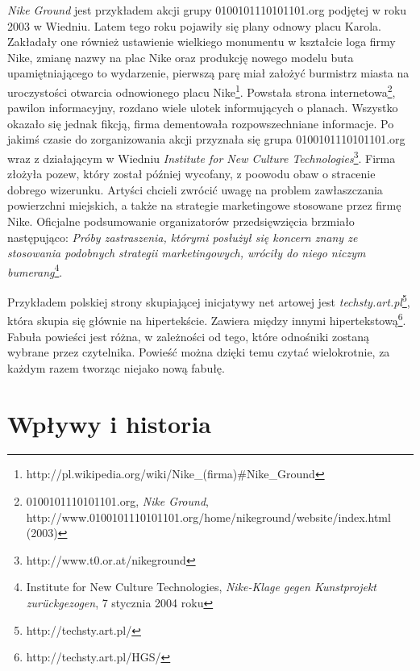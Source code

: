 \documentclass[a4paper,12pt,twoside]{article}
\begin{document}
\textit{Nike Ground} jest przykładem akcji grupy 
0100101110101101.org podjętej w roku 2003 w Wiedniu. Latem tego roku
pojawiły się plany odnowy placu Karola. Zakładały one również ustawienie
wielkiego monumentu w kształcie loga firmy Nike, zmianę nazwy na
plac Nike oraz produkcję nowego modelu buta upamiętniającego to wydarzenie,
pierwszą parę miał założyć burmistrz miasta na uroczystości otwarcia
odnowionego placu
Nike\footnote{ http://pl.wikipedia.org/wiki/Nike\_(firma)\#Nike\_Ground}.
Powstała strona
internetowa\footnote{ 0100101110101101.org, \textit{Nike Ground}, 
http://www.0100101110101101.org/home/nikeground/website/index.html (2003)},
pawilon informacyjny, rozdano wiele ulotek informujących o planach.
Wszystko okazało się jednak fikcją, firma dementowała rozpowszechniane
informacje. Po jakimś czasie do zorganizowania akcji przyznała się
grupa 0100101110101101.org wraz z działającym w Wiedniu \textit{Institute
for New Culture Technologies}\footnote{ http://www.t0.or.at/nikeground}.
Firma złożyła pozew, który został później wycofany, z poowodu obaw
o stracenie dobrego wizerunku. Artyści chcieli zwrócić uwagę na problem
zawłaszczania powierzchni miejskich, a także na strategie marketingowe
stosowane przez firmę Nike. Oficjalne podsumowanie organizatorów
przedsięwzięcia brzmiało następująco: \textit{Próby zastraszenia, którymi
posłużył się koncern znany ze stosowania podobnych strategii marketingowych,
wróciły do niego niczym bumerang}\footnote{ Institute for New Culture
Technologies, \textit{Nike-Klage gegen Kunstprojekt zurückgezogen},
7 stycznia 2004 roku}.

Przykładem polskiej strony skupiającej inicjatywy net artowej jest
\textit{techsty.art.pl}\footnote{ http://techsty.art.pl/},
która skupia się głównie na hipertekście. Zawiera między innymi
hipertekstową\footnote{ http://techsty.art.pl/HGS/}. Fabuła powieści
jest różna, w zależności od tego, które odnośniki zostaną wybrane
przez czytelnika. Powieść można dzięki temu czytać wielokrotnie, za
każdym razem tworząc niejako nową fabułę.

\section{Wpływy i historia}
\end{document}

